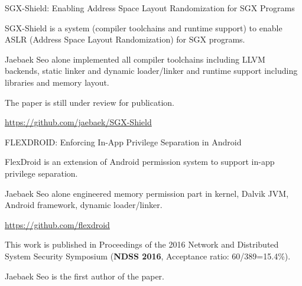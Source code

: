 

\begin{cventries}

  \paperentry
    {SGX-Shield: Enabling Address Space Layout Randomization for SGX Programs} %
    {} %
    {
        \begin{cvitems} %
        \item {SGX-Shield is a system (compiler toolchains and runtime support)
            to enable ASLR (Address Space Layout Randomization) for SGX programs.}
        \item {Jaebaek Seo alone implemented all compiler toolchains including
                LLVM backends, static linker and dynamic loader/linker and runtime
            support including libraries and memory layout.}
        \item {The paper is still under review for publication.}
        \item {\url{https://github.com/jaebaek/SGX-Shield}}
        \end{cvitems}
    }

  \paperentry
    {FLEXDROID: Enforcing In-App Privilege Separation in Android} %
    {} %
    {
        \begin{cvitems} %
        \item {FlexDroid is an extension of Android permission system
            to support in-app privilege separation.}
        \item {Jaebaek Seo alone engineered memory permission part in kernel,
            Dalvik JVM, Android framework, dynamic loader/linker.}
        \item {\url{https://github.com/flexdroid}}
        \item {This work is published in Proceedings of the 2016 Network and
                Distributed System Security Symposium (\textbf{NDSS 2016},
                Acceptance ratio: 60/389=15.4\%).}
        \item {Jaebaek Seo is the first author of the paper.}
        \end{cvitems}
    }


\end{cventries}
